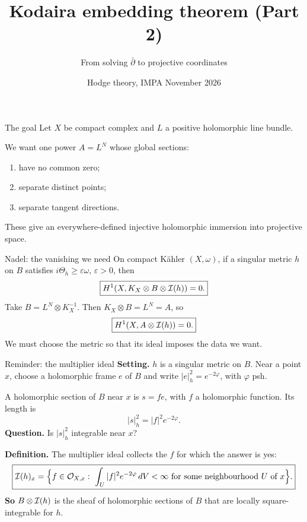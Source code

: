 
\title{Kodaira embedding theorem (Part 2)}
\subtitle{From solving \(\bar\partial\) to projective coordinates}
\date{Hodge theory, IMPA  November 2026}

\begin{frame}\titlepage\end{frame}

\begin{frame}{The goal}
Let \(X\) be compact complex and \(L\) a positive holomorphic line bundle.
\par\bigskip
We want one power \(A=L^N\) whose global sections:
\begin{enumerate}
\setlength{\itemsep}{12pt}
\item have no common zero;
\item separate distinct points;
\item separate tangent directions.
\end{enumerate}
\par\bigskip
These give an everywhere-defined injective holomorphic immersion into projective space.
\end{frame}

\begin{frame}{Nadel: the vanishing we need}
On compact Kähler \((X,\omega)\), if a singular metric \(h\) on \(B\) satisfies \(i\Theta_h\ge\varepsilon\omega\), \(\varepsilon>0\), then
\[
\boxed{H^1(X,K_X\otimes B\otimes\mathcal I(h))=0.}
\]
Take \(B=L^N\otimes K_X^{-1}\). Then \(K_X\otimes B=L^N=A\), so
\[
\boxed{H^1(X,A\otimes\mathcal I(h))=0.}
\]
We must choose the metric so that its ideal imposes the data we want.
\end{frame}

\begin{frame}{Reminder: the multiplier ideal}
\label{fr:mi-def}
\textbf{Setting.} \(h\) is a singular metric on \(B\). Near a point \(x\), choose a holomorphic frame \(e\) of \(B\) and write \(|e|_h^2=e^{-2\varphi}\), with \(\varphi\) psh.
\par\medskip
A holomorphic section of \(B\) near \(x\) is \(s=fe\), with \(f\) a holomorphic function. Its length is
\[
|s|_h^2=|f|^2e^{-2\varphi}.
\]
\textbf{Question.} Is \(|s|_h^2\) integrable near \(x\)?
\par\medskip
\textbf{Definition.} The multiplier ideal collects the \(f\) for which the answer is yes:
\[
\boxed{\cI(h)_x=\Bigl\{f\in\cO_{X,x}:\ \int_U|f|^2e^{-2\varphi}\,dV<\infty\ \text{for some neighbourhood } U \text{ of } x\Bigr\}.}
\]
\textbf{So} \(B\otimes\mathcal I(h)\) is the sheaf of holomorphic sections of \(B\) that are locally square-integrable for \(h\).
\end{frame}

